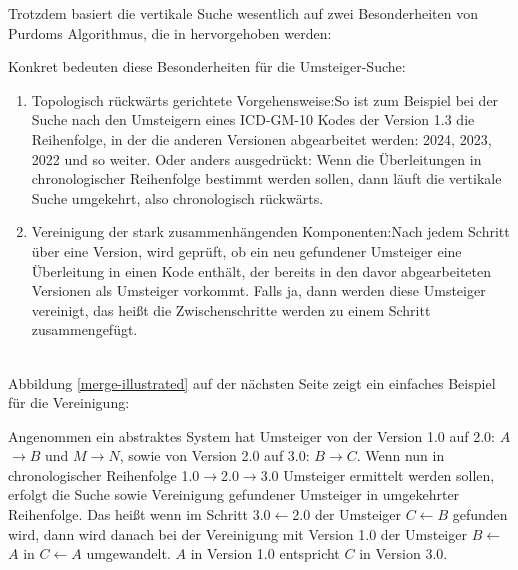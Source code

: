 Trotzdem basiert die vertikale Suche wesentlich auf zwei Besonderheiten von Purdoms Algorithmus, die in \cite[Seite 76f]{dar1993augmenting} hervorgehoben werden:

\begin{figure}[H]
    \centering
    \setlength{\fboxsep}{10pt}\color{black!20}
    \normalcolor%
\end{figure}

Konkret bedeuten diese Besonderheiten für die Umsteiger-Suche:

\begin{enumerate}
\item Topologisch rückwärts gerichtete Vorgehensweise:\newline So ist zum Beispiel bei der Suche nach den Umsteigern eines ICD-GM-10 Kodes der Version 1.3 die Reihenfolge, in der die anderen Versionen abgearbeitet werden: 2024, 2023, 2022 und so weiter. Oder anders ausgedrückt: Wenn die Überleitungen in chronologischer Reihenfolge bestimmt werden sollen, dann läuft die vertikale Suche umgekehrt, also chronologisch rückwärts. 
\item Vereinigung der stark zusammenhängenden Komponenten:\newline Nach jedem Schritt über eine Version, wird geprüft, ob ein neu gefundener Umsteiger eine Überleitung in einen Kode enthält, der bereits in den davor abgearbeiteten Versionen als Umsteiger vorkommt. Falls ja, dann werden diese Umsteiger vereinigt, das heißt die Zwischenschritte werden zu einem Schritt zusammengefügt. 
\end{enumerate}

\ \\

Abbildung \ref{merge-illustrated} auf der nächsten Seite zeigt ein einfaches Beispiel für die Vereinigung: 

Angenommen ein abstraktes System hat Umsteiger von der Version 1.0 auf 2.0: $A$$\rightarrow$$B$ und $M$$\rightarrow$$N$, sowie von Version 2.0 auf 3.0: $B$$\rightarrow$$C$. Wenn nun in chronologischer Reihenfolge 1.0$\rightarrow$2.0$\rightarrow$3.0 Umsteiger ermittelt werden sollen, erfolgt die Suche sowie Vereinigung gefundener Umsteiger in umgekehrter Reihenfolge. Das heißt wenn im Schritt 3.0$\leftarrow$2.0 der Umsteiger $C$$\leftarrow$$B$ gefunden wird, dann wird danach bei der Vereinigung mit Version 1.0 der Umsteiger $B$$\leftarrow$$A$ in $C$$\leftarrow$$A$ umgewandelt. $A$ in Version 1.0 entspricht $C$ in Version 3.0. 

